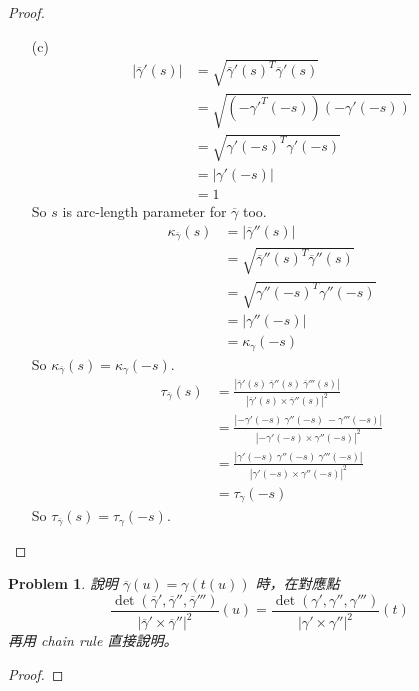 \documentclass[10pt,a4paper]{article}
\newcounter{theProblemCounter}
\newtheorem{problem}[theProblemCounter]{Problem}
\begin{document}
\begin{proof}
\begin{enumerate}
\item[(c)]
\begin{align*}
\left|\overline{\gamma}'(s)\right|&=\sqrt{\overline{\gamma}'(s)^T\overline{\gamma}'(s)}\\
&=\sqrt{\left(-\gamma'^T(-s)\right)\left(-\gamma'(-s)\right)}\\
&=\sqrt{\gamma'(-s)^T\gamma'(-s)}\\
&=\left|\gamma'(-s)\right|\\
&=1
\end{align*}
So $s$ is arc-length parameter for $\overline{\gamma}$ too.\\
\begin{align*}
\kappa_{\overline{\gamma}}(s)&=\left|\overline{\gamma}''(s)\right|\\
&=\sqrt{\overline{\gamma}''(s)^T\overline{\gamma}''(s)}\\
&=\sqrt{\gamma''(-s)^T\gamma''(-s)}\\
&=\left|\gamma''(-s)\right|\\
&=\kappa_{\gamma}(-s)
\end{align*}
So $\kappa_{\overline{\gamma}}(s)=\kappa_{\gamma}(-s)$.
\begin{align*}
\tau_{\overline{\gamma}}(s)&=\frac{\left|\overline{\gamma}'(s)\ \overline{\gamma}''(s)\ \overline{\gamma}'''(s)\right|}{\left|\overline{\gamma}'(s)\times\overline{\gamma}''(s)\right|^2}\\
&=\frac{\left|-\gamma'(-s)\ \gamma''(-s)\ -\gamma'''(-s)\right|}{\left|-\gamma'(-s)\times\gamma''(-s)\right|^2}\\
&=\frac{\left|\gamma'(-s)\ \gamma''(-s)\ \gamma'''(-s)\right|}{\left|\gamma'(-s)\times\gamma''(-s)\right|^2}\\
&=\tau_{\gamma}(-s)
\end{align*}
So $\tau_{\overline{\gamma}}(s)=\tau_{\gamma}(-s)$.
\end{enumerate}
\end{proof}

\setcounter{theProblemCounter}{7}
\begin{problem}
說明 $\overline{\gamma}(u)=\gamma(t(u))$ 時，在對應點%
\[
\frac{\det(\overline\gamma',\overline\gamma'',
\overline\gamma''')}{|\overline\gamma'\times \overline\gamma''|^2}(u) = 
\frac{\det(\gamma',\gamma'',\gamma''')}{|\gamma'\times\gamma''|^2}(t)
\]
再用 chain rule 直接說明。
\end{problem}
\begin{proof}
\end{proof}
\end{document}

